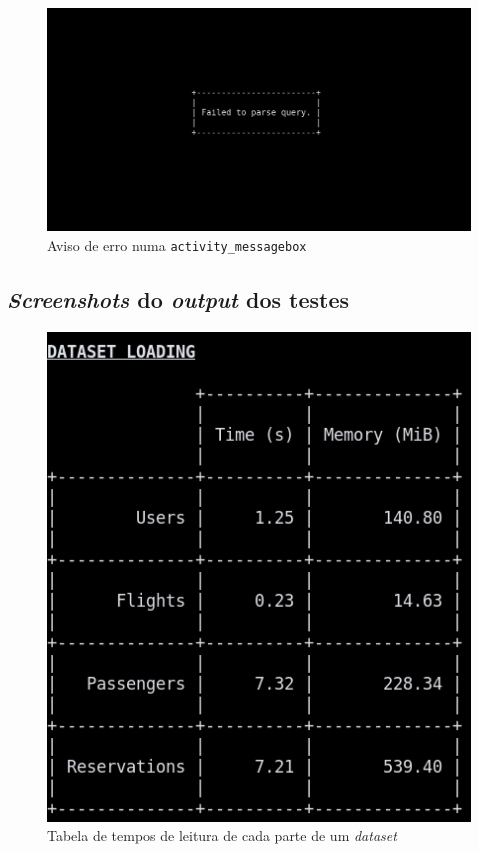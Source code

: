 \documentclass[11pt, a4paper]{article}
\begin{document}
\begin{figure}[H]
    \centering
    \includegraphics[scale=0.25]{res-fase2/interactive_screenshots/messagebox.png}
    \caption{Aviso de erro numa \texttt{activity\_messagebox}}
    \label{fig:messagebox}
\end{figure}

\subsection{\emph{Screenshots} do \emph{output} dos testes}
\label{sec:testing-screenshots}

\begin{figure}[H]
    \centering
    \includegraphics[scale=0.4]{res-fase2/testing_screenshots/dataset.png}
    \caption{Tabela de tempos de leitura de cada parte de um \emph{dataset}}
    \label{fig:dataset-screenshot}
\end{figure}
\end{document}
